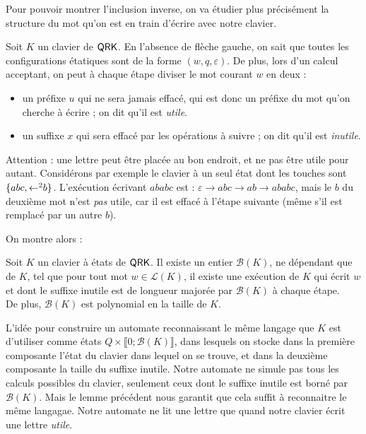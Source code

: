\documentclass[12pt, a4paper]{article}
\renewcommand{\L}{\mathcal{L}}
\begin{document}
    Pour pouvoir montrer l'inclusion inverse, on va étudier plus précisément la structure du mot qu'on est en train d'écrire avec notre clavier.
    
    Soit $K$ un clavier de $\mathsf{QRK}$. En l'absence de flèche gauche, on sait que toutes les configurations étatiques sont de la forme $(w,q,\varepsilon)$. De plus, lors d'un calcul acceptant, on peut à chaque étape diviser le mot courant $w$ en deux :
    \begin{itemize}
        \item un préfixe $u$ qui ne sera jamais effacé, qui est donc un préfixe du mot qu'on cherche à écrire ; on dit qu'il est \emph{utile}.
        \item un suffixe $x$ qui sera effacé par les opérations à suivre ; on dit qu'il est \emph{inutile}.
    \end{itemize}
    \begin{example}[Remarque]
        Attention : une lettre peut être placée au bon endroit, et ne pas être utile pour autant. Considérons par exemple le clavier à un seul état dont les touches sont $\{abc,\mathord{\leftarrow}^2b\}$.
        L'exécution écrivant $ababc$ est : $\varepsilon \rightarrow abc \rightarrow ab \rightarrow ababc$, mais le $b$ du deuxième mot n'est \emph{pas} utile, car il est effacé à l'étape suivante (même s'il est remplacé par un autre $b$). \smallskip
    \end{example}
    

    On montre alors :
    \begin{inutilesbornés}\label{bk}
        Soit $K$ un clavier à états de $\mathsf{QRK}$. Il existe un entier $\mathcal{B}(K)$, ne dépendant que de $K$, tel que pour tout mot $w \in \L(K)$,
        il existe une exécution de $K$ qui écrit $w$ et dont le suffixe inutile est de longueur majorée par $\mathcal{B}(K)$ à chaque étape. \\
        De plus, $\mathcal{B}(K)$ est polynomial en la taille de $K$.
    \end{inutilesbornés}
    L'idée pour construire un automate reconnaissant le même langage que $K$ est d'utiliser comme états $Q \times \llbracket 0 ; \mathcal{B}(K) \rrbracket$, dans lesquels on stocke dans la première composante l'état du clavier dans lequel on se trouve,
    et dans la deuxième composante la taille du suffixe inutile. Notre automate ne simule pas tous les calculs possibles du clavier, seulement ceux dont le suffixe  inutile est borné par $\mathcal{B}(K)$. Mais le lemme précédent nous garantit que cela suffit à reconnaitre le même langagae. Notre automate ne lit une lettre que quand notre clavier écrit une lettre \emph{utile}.
    
\end{document}

